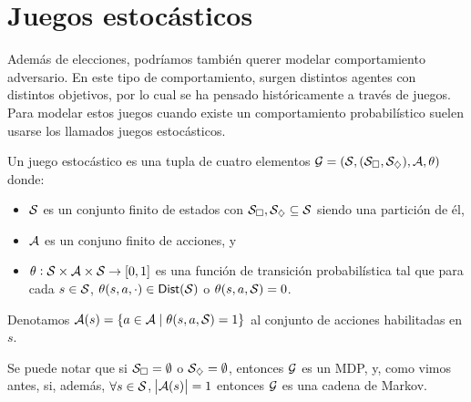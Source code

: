 


\section{Juegos estocásticos}
\label{sec:sg}

Además de elecciones, podríamos también querer modelar comportamiento
adversario. En este tipo de comportamiento, surgen distintos agentes con
distintos objetivos, por lo cual se ha pensado históricamente a través de
juegos. Para modelar estos juegos cuando existe un comportamiento
probabilístico suelen usarse los llamados juegos estocásticos.

\begin{definition}
	Un juego estocástico es una tupla de cuatro elementos $\mathcal{G} = (\mathcal{S}, (\mathcal{S}_\square, \mathcal{S}_\diamondsuit), \mathcal{A}, \theta)$ donde:
	\begin{itemize}
		\item $\mathcal{S}$ es un conjunto finito de estados con $\mathcal{S}_\square, \mathcal{S}_\diamondsuit \subseteq \mathcal{S}$ siendo una partición de él,
		\item $\mathcal{A}$ es un conjuno finito de acciones, y
		\item $\theta : \mathcal{S} \times \mathcal{A} \times \mathcal{S} \rightarrow [0,1]$ es una función de transición probabilística tal que para cada $s \in \mathcal{S}$, $\theta(s, a, \cdot) \in \mathsf{Dist}(\mathcal{S})$ o  $\theta(s, a, \mathcal{S}) = 0$.
	\end{itemize}
	Denotamos $\mathcal{A}(s) = \{a \in \mathcal{A} \mid \theta(s,a,\mathcal{S}) = 1\}$ al conjunto de acciones habilitadas en $s$.
\end{definition}

Se puede notar que si $\mathcal{S}_\square = \emptyset$ o $\mathcal{S}_\diamondsuit = \emptyset$,
entonces $\mathcal{G}$ es un MDP, y, como vimos antes, si, además, $\forall s \in \mathcal{S}$,
$\abs{\mathcal{A}(s)} = 1$ entonces $\mathcal{G}$ es una cadena de Markov.

